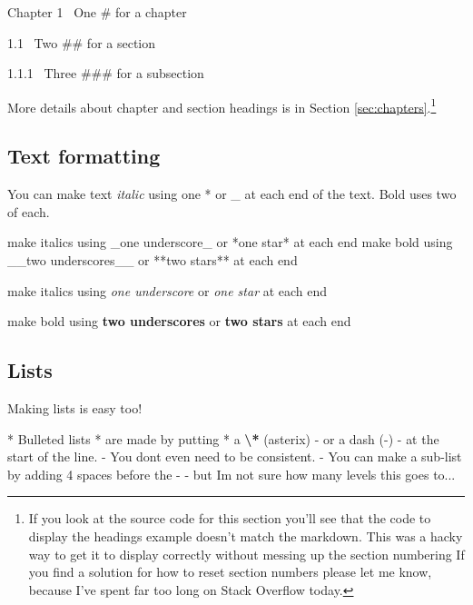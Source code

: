 \documentclass[
]{book}
\newenvironment{Shaded}{\begin{snugshade}}{\end{snugshade}}
\newcommand{\NormalTok}[1]{#1}
\newcommand{\SpecialCharTok}[1]{\textcolor[rgb]{0.81,0.36,0.00}{\textbf{#1}}}
\newcommand{\SpecialStringTok}[1]{\textcolor[rgb]{0.31,0.60,0.02}{#1}}
\begin{document}
Chapter 1 ~One \# for a chapter

1.1 ~Two \#\# for a section

1.1.1 ~Three \#\#\# for a subsection

More details about chapter and section headings is in Section \ref{sec:chapters}.\footnote{If you look at the source code for this section you'll see that the code to display the headings example doesn't match the markdown. This was a hacky way to get it to display correctly without messing up the section numbering If you find a solution for how to reset section numbers please let me know, because I've spent far too long on Stack Overflow today.}

\subsection{Text formatting}\label{sec:text-formatting}

You can make text \emph{italic} using one * or \_ at each end of the text. Bold uses two of each.

\begin{Shaded}
\begin{Highlighting}[]
\NormalTok{make italics using \_one underscore\_ or *one star* at each end}
\NormalTok{make bold using \_\_two underscores\_\_ or **two stars** at each end}
\end{Highlighting}
\end{Shaded}

make italics using \emph{one underscore} or \emph{one star} at each end

make bold using \textbf{two underscores} or \textbf{two stars} at each end

\subsection{Lists}\label{sec:lists}

Making lists is easy too!

\begin{Shaded}
\begin{Highlighting}[]
\SpecialStringTok{*   }\NormalTok{Bulleted lists}
\SpecialStringTok{*   }\NormalTok{are made by putting}
\SpecialStringTok{*   }\NormalTok{a }\SpecialCharTok{\textbackslash{}*}\NormalTok{ (asterix) }
\SpecialStringTok{{-}   }\NormalTok{or a dash ({-})}
\SpecialStringTok{{-}   }\NormalTok{at the start of the line.}
\SpecialStringTok{{-}   }\NormalTok{You don\textquotesingle{}t even need to be consistent.}
\SpecialStringTok{    {-} }\NormalTok{You can make a sub{-}list by adding 4 spaces before the {-}}
\SpecialStringTok{        {-} }\NormalTok{but I\textquotesingle{}m not sure how many levels this goes to...}
\end{Highlighting}
\end{Shaded}
\end{document}
